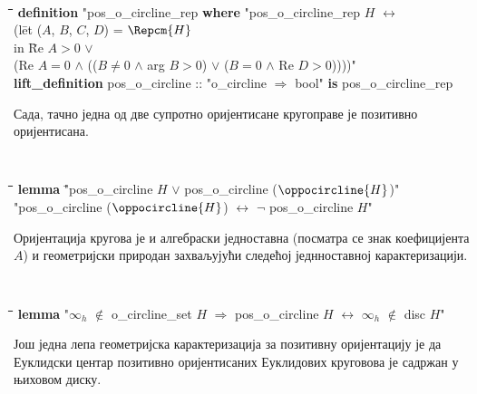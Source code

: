 {\tt
  \begin{tabbing}
    \hspace{5mm}\=\hspace{5mm}\=\hspace{5mm}\=\hspace{5mm}\=\hspace{5mm}\=\kill
{\bf definition} "pos\_o\_circline\_rep {\bf where} "pos\_o\_circline\_rep $H$ $\longleftrightarrow$\\
\>(l\=et ($A$, $B$, $C$, $D$) = $\Repcm{H}$\\ 
\>\>  in \=Re $A > 0$ $\vee$ \\
\>\>\>(Re $A = 0$ $\wedge$ (($B \neq 0$ $\wedge$ arg $B > 0$) $\vee$ ($B = 0$ $\wedge$ Re $D > 0$))))"\\
{\bf lift\_definition} pos\_o\_circline :: "o\_circline $\Rightarrow$ bool" {\bf is} pos\_o\_circline\_rep
  \end{tabbing}
}

\noindent Сада, тачно једна од две супротно оријентисане кругоправе је
позитивно оријентисана.

{\tt
  \begin{tabbing}
    \hspace{5mm}\=\hspace{5mm}\=\hspace{5mm}\=\hspace{5mm}\=\hspace{5mm}\=\kill
{\bf lemma} \="pos\_o\_circline $H$ $\vee$ pos\_o\_circline ($\oppocircline{H}$)"\\
\>  "pos\_o\_circline ($\oppocircline{H}$) $\longleftrightarrow$ $\neg$ pos\_o\_circline $H$"
  \end{tabbing}
}

Оријентација кругова је и алгебраски једноставна (посматра се знак
коефицијента $A$) и геометријски природан захваљујући следећој
једнноставној карактеризацији.

{\tt
  \begin{tabbing}
    \hspace{5mm}\=\hspace{5mm}\=\hspace{5mm}\=\hspace{5mm}\=\hspace{5mm}\=\kill
{\bf lemma} "$\infty_h$  $\notin$ o\_circline\_set $H$ $\Longrightarrow$ pos\_o\_circline $H$ $\longleftrightarrow$ $\infty_h$ $\notin$ disc $H$"
  \end{tabbing}
}

\noindent Још једна лепа геометријска карактеризација за позитивну
оријентацију је да Еуклидски центар позитивно оријентисаних Еуклидових
круговова је садржан у њиховом диску.

